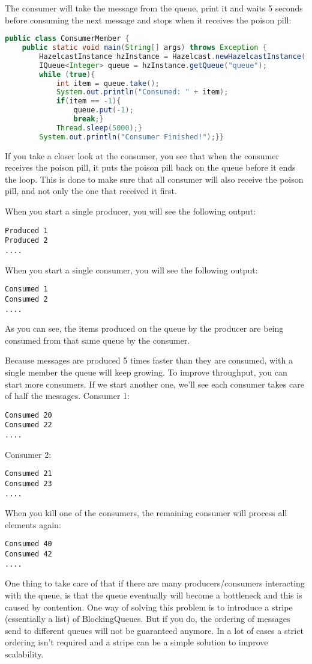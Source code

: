 The consumer will take the message from the queue, print it and waits 5 seconds before consuming the next message and stops when it receives the poison pill:
\begin{lstlisting}[language=java]
public class ConsumerMember {
    public static void main(String[] args) throws Exception {
        HazelcastInstance hzInstance = Hazelcast.newHazelcastInstance();
        IQueue<Integer> queue = hzInstance.getQueue("queue");
        while (true){
            int item = queue.take();
            System.out.println("Consumed: " + item);
            if(item == -1){
                queue.put(-1);
                break;}     
            Thread.sleep(5000);}
        System.out.println("Consumer Finished!");}}
\end{lstlisting}
If you take a closer look at the consumer, you see that when the consumer receives the poison pill, it puts the poison pill back on the queue before it ends the loop. This is done to make sure that all consumer will also receive the poison pill, and not only the one that received it first.

When you start a single producer, you will see the following output:
\begin{lstlisting}
Produced 1
Produced 2
....
\end{lstlisting}
When you start a single consumer, you will see the following output:
\begin{lstlisting}
Consumed 1
Consumed 2
....
\end{lstlisting}
As you can see, the items produced on the queue by the producer are being consumed from that same queue by the consumer. 

Because messages are produced 5 times faster than they are consumed, with a single member the queue will keep growing. To improve throughput, you can start more consumers. If we start another one, we'll see each consumer takes care of half the messages. Consumer 1:
\begin{lstlisting}
Consumed 20
Consumed 22
....
\end{lstlisting}
Consumer 2:
\begin{lstlisting}
Consumed 21
Consumed 23
....
\end{lstlisting}
When you kill one of the consumers, the remaining consumer will process all elements again:
\begin{lstlisting}
Consumed 40  
Consumed 42 
....
\end{lstlisting}
One thing to take care of that if there are many producers/consumers interacting with the queue, is that the queue eventually will become a bottleneck and this is caused by contention. One way of solving this problem is to introduce a stripe (essentially a list) of BlockingQueues. But if you do, the ordering of messages send to different queues will not be guaranteed anymore. In a lot of cases a strict ordering isn't required and a stripe can be a simple solution to improve scalability.

